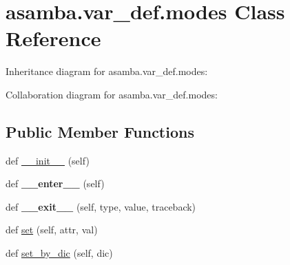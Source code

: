 \hypertarget{classasamba_1_1var__def_1_1modes}{}\section{asamba.\+var\+\_\+def.\+modes Class Reference}
\label{classasamba_1_1var__def_1_1modes}


Inheritance diagram for asamba.\+var\+\_\+def.\+modes\+:


Collaboration diagram for asamba.\+var\+\_\+def.\+modes\+:
\subsection*{Public Member Functions}
\begin{DoxyCompactItemize}
\item 
def \hyperlink{classasamba_1_1var__def_1_1modes_a3e7e2e2e01dadeb07002bde1f8e35ac9}{\+\_\+\+\_\+init\+\_\+\+\_\+} (self)
\item 
\mbox{\label{classasamba_1_1var__def_1_1modes_ae15778f02288da4abc131dfd5d0af151}} 
def {\bfseries \+\_\+\+\_\+enter\+\_\+\+\_\+} (self)
\item 
\mbox{\label{classasamba_1_1var__def_1_1modes_a928762de62f113e943da5a711c546397}} 
def {\bfseries \+\_\+\+\_\+exit\+\_\+\+\_\+} (self, type, value, traceback)
\item 
def \hyperlink{classasamba_1_1var__def_1_1modes_a68e3175f54a123a371a9e5345b2cfe6e}{set} (self, attr, val)
\item 
def \hyperlink{classasamba_1_1var__def_1_1modes_a2d9b87e9cdfe54142627a502476bb868}{set\+\_\+by\+\_\+dic} (self, dic)
\end{DoxyCompactItemize}
